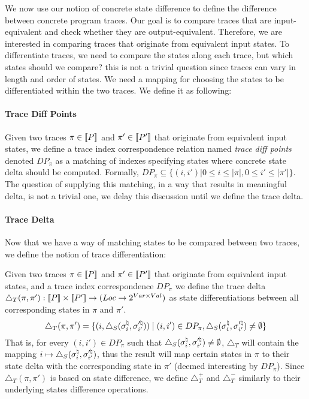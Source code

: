 We now use our notion of concrete state difference to define the difference between concrete program traces. Our goal is to compare traces that are input-equivalent and check whether they are output-equivalent.
Therefore, we are interested in comparing traces that originate from equivalent input states. To differentiate traces, we need to compare the states along each trace, but which states should we compare? this is not a trivial question since traces can vary in length and order of states. We need a mapping for choosing the states to be differentiated within the two traces. We define it as following:


\paragraph{Trace Diff Points} 
Given two traces $\pi \in \lbrack\!\lbrack P \rbrack\!\rbrack$ and $\pi' \in \lbrack\!\lbrack P' \rbrack\!\rbrack$ that originate from equivalent input states, we define a trace index correspondence relation named \emph{trace diff points} denoted $DP_{\pi}$ as a matching of indexes specifying states where concrete state delta should be computed. Formally, 
$DP_{\pi} \subseteq \{(i,i')| 0 \leq i \leq |\pi|, 0 \leq i' \leq |\pi'|\}$. The question of supplying this matching, in a way that results in meaningful delta, is not a trivial one, we delay this discussion until we define the trace delta.

\paragraph{Trace Delta}
Now that we have a way of matching states to be compared between two traces, we define the notion of trace differentiation:
\begin{definition}
Given two traces $\pi \in \lbrack\!\lbrack P \rbrack\!\rbrack$ and $\pi' \in \lbrack\!\lbrack P' \rbrack\!\rbrack$ that originate from equivalent input states, and a trace index correspondence $DP_{\pi}$ we define the trace delta $\triangle_{T}(\pi,\pi') : \lbrack\!\lbrack P \rbrack\!\rbrack \times \lbrack\!\lbrack P' \rbrack\!\rbrack \rightarrow (Loc \rightarrow 2^{Var \times Val})$ as state differentiations between all corresponding states in $\pi$ and $\pi'$.
\[
\triangle_{T}(\pi,\pi') = \{ (i,\triangle_{S}(\sigma^\natural_{i},\sigma'^\natural_{i'})) \mid (i,i') \in DP_{\pi}, \triangle_{S}(\sigma^\natural_{i},\sigma'^\natural_{i'}) \neq \emptyset \}
\]
That is, for every $(i,i') \in DP_{\pi}$ such that $\triangle_{S}(\sigma^\natural_{i},\sigma'^\natural_{i'}) \neq \emptyset$, $\triangle_{T}$ will contain the mapping $i \mapsto \triangle_{S}(\sigma^\natural_{i},\sigma'^\natural_{i'})$, thus the result will map certain states in $\pi$ to their state delta with the corresponding state in $\pi'$ (deemed interesting by $DP_{\pi}$). Since $\triangle_{T}(\pi,\pi')$ is based on state difference, we define $\triangle_{T}^{+}$ and $\triangle_{T}^{-}$ similarly to their underlying states difference operations.
\end{definition}

